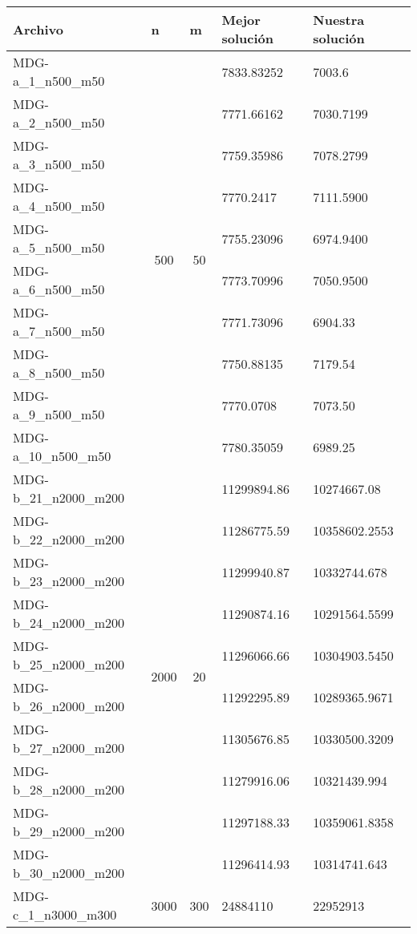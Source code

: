 \begin{table}[h!]
    \centering
    \begin{tabular}{lc|cll}
    \hline
    \textbf{Archivo} & \multicolumn{1}{l|}{\textbf{n}} & \multicolumn{1}{l}{\textbf{m}} & \multicolumn{1}{l}{\textbf{Mejor solución}} & \textbf{Nuestra solución} \\ \hline
    MDG-a\_1\_n500\_m50 & \multirow{10}{*}{500} & \multirow{10}{*}{50} & 7833.83252 & 7003.6 \\
    MDG-a\_2\_n500\_m50 &  &  & 7771.66162 & 7030.7199 \\
    MDG-a\_3\_n500\_m50 &  &  & 7759.35986 & 7078.2799 \\
    MDG-a\_4\_n500\_m50 &  &  & 7770.2417 & 7111.5900 \\
    MDG-a\_5\_n500\_m50 &  &  & 7755.23096 & 6974.9400 \\
    MDG-a\_6\_n500\_m50 &  &  & 7773.70996 & 7050.9500 \\
    MDG-a\_7\_n500\_m50 &  &  & 7771.73096 & 6904.33 \\
    MDG-a\_8\_n500\_m50 &  &  & 7750.88135 & 7179.54 \\
    MDG-a\_9\_n500\_m50 &  &  & 7770.0708 & 7073.50 \\
    MDG-a\_10\_n500\_m50 &  &  & 7780.35059 & 6989.25 \\ \midrule
    MDG-b\_21\_n2000\_m200 & \multirow{10}{*}{2000} & \multirow{10}{*}{20} & 11299894.86 & 10274667.08 \\
    MDG-b\_22\_n2000\_m200 &  &  & 11286775.59 & 10358602.2553 \\
    MDG-b\_23\_n2000\_m200 &  &  & 11299940.87 & 10332744.678 \\
    MDG-b\_24\_n2000\_m200 &  &  & 11290874.16 & 10291564.5599 \\
    MDG-b\_25\_n2000\_m200 &  &  & 11296066.66 & 10304903.5450 \\
    MDG-b\_26\_n2000\_m200 &  &  & 11292295.89 & 10289365.9671 \\
    MDG-b\_27\_n2000\_m200 &  &  & 11305676.85 & 10330500.3209 \\
    MDG-b\_28\_n2000\_m200 &  &  & 11279916.06 & 10321439.994 \\
    MDG-b\_29\_n2000\_m200 &  &  & 11297188.33 & 10359061.8358 \\
    MDG-b\_30\_n2000\_m200 &  &  & 11296414.93 & 10314741.643 \\ \midrule
    MDG-c\_1\_n3000\_m300 & \multirow{10}{*}{3000} & \multirow{2}{*}{300} & 24884110 & 22952913 \\

\end{tabular}
\end{table}
